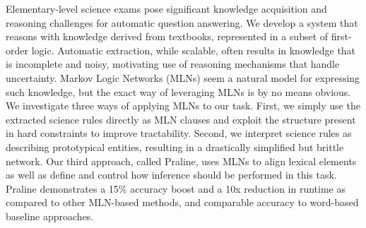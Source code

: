 Elementary-level science exams pose significant knowledge acquisition and reasoning challenges for automatic question answering. We develop a system that reasons with knowledge derived from textbooks, represented in a subset of first-order logic. Automatic extraction, while scalable, often results in knowledge that is incomplete and noisy, motivating use of reasoning mechanisms that handle uncertainty. Markov Logic Networks (MLNs) seem a natural model for expressing such knowledge, but the exact way of leveraging MLNs is by no means obvious. We investigate three ways of applying MLNs to our task. First, we simply use the extracted science rules directly as MLN clauses and exploit the structure present in hard constraints to improve tractability. Second, we interpret science rules as describing prototypical entities, resulting in a drastically simplified but brittle network. Our third approach, called Praline, uses MLNs to align lexical elements as well as define and control how inference should be performed in this task. Praline demonstrates a 15\% accuracy boost and a 10x reduction in runtime as compared to other MLN-based methods, and comparable accuracy to word-based baseline approaches.

